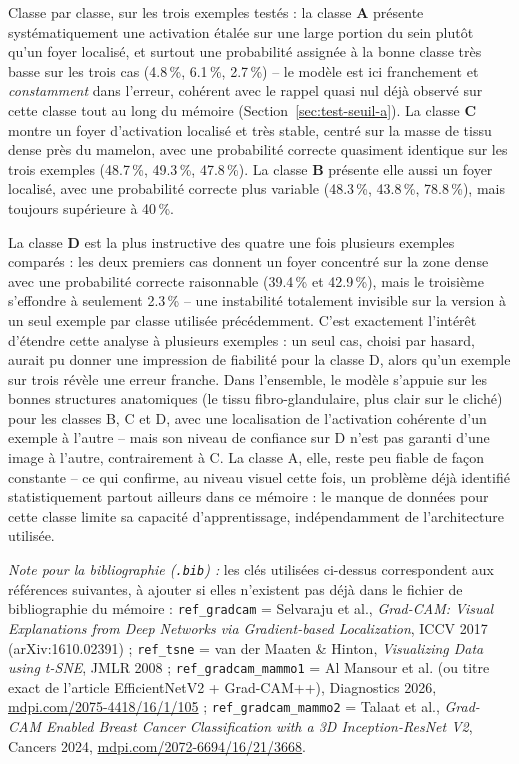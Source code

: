 \documentclass[12pt,a4paper]{report}
\begin{document}
Classe par classe, sur les trois exemples testés : la classe \textbf{A}
présente systématiquement une activation étalée sur une large portion du
sein plutôt qu'un foyer localisé, et surtout une probabilité assignée à la
bonne classe très basse sur les trois cas (4.8\,\%, 6.1\,\%, 2.7\,\%) -- le
modèle est ici franchement et \emph{constamment} dans l'erreur, cohérent
avec le rappel quasi nul déjà observé sur cette classe tout au long du
mémoire (Section~\ref{sec:test-seuil-a}). La classe \textbf{C} montre un
foyer d'activation localisé et très stable, centré sur la masse de tissu
dense près du mamelon, avec une probabilité correcte quasiment identique
sur les trois exemples (48.7\,\%, 49.3\,\%, 47.8\,\%). La classe \textbf{B}
présente elle aussi un foyer localisé, avec une probabilité correcte plus
variable (48.3\,\%, 43.8\,\%, 78.8\,\%), mais toujours supérieure à 40\,\%.

La classe \textbf{D} est la plus instructive des quatre une fois plusieurs
exemples comparés : les deux premiers cas donnent un foyer concentré sur la
zone dense avec une probabilité correcte raisonnable (39.4\,\% et
42.9\,\%), mais le troisième s'effondre à seulement 2.3\,\% -- une
instabilité totalement invisible sur la version à un seul exemple par
classe utilisée précédemment. C'est exactement l'intérêt d'étendre cette
analyse à plusieurs exemples : un seul cas, choisi par hasard, aurait pu
donner une impression de fiabilité pour la classe D, alors qu'un exemple
sur trois révèle une erreur franche. Dans l'ensemble, le modèle s'appuie
sur les bonnes structures anatomiques (le tissu fibro-glandulaire, plus
clair sur le cliché) pour les classes B, C et D, avec une localisation de
l'activation cohérente d'un exemple à l'autre -- mais son niveau de
confiance sur D n'est pas garanti d'une image à l'autre, contrairement à C.
La classe A, elle, reste peu fiable de façon constante -- ce qui confirme,
au niveau visuel cette fois, un problème déjà identifié statistiquement
partout ailleurs dans ce mémoire : le manque de données pour cette classe
limite sa capacité d'apprentissage, indépendamment de l'architecture
utilisée.

\vspace{0.3cm}
\noindent\textit{Note pour la bibliographie (\texttt{.bib}) :} les clés
utilisées ci-dessus correspondent aux références suivantes, à ajouter si
elles n'existent pas déjà dans le fichier de bibliographie du mémoire :
\texttt{ref\_gradcam} = Selvaraju et al., \emph{Grad-CAM: Visual Explanations
from Deep Networks via Gradient-based Localization}, ICCV 2017
(arXiv:1610.02391) ; \texttt{ref\_tsne} = van der Maaten \& Hinton,
\emph{Visualizing Data using t-SNE}, JMLR 2008 ;
\texttt{ref\_gradcam\_mammo1} = Al Mansour et al. (ou titre exact de l'article
EfficientNetV2 + Grad-CAM++), Diagnostics 2026, \url{mdpi.com/2075-4418/16/1/105} ;
\texttt{ref\_gradcam\_mammo2} = Talaat et al., \emph{Grad-CAM Enabled Breast
Cancer Classification with a 3D Inception-ResNet V2}, Cancers 2024,
\url{mdpi.com/2072-6694/16/21/3668}.
\end{document}
